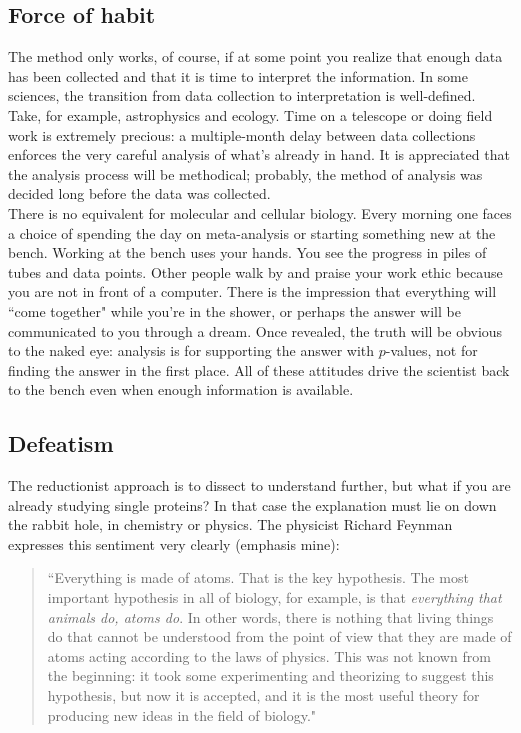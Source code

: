 \documentclass{article}
\begin{document}
\subsection*{Force of habit}

The method only works, of course, if at some point you realize that enough data has been collected and that it is time to interpret the information. In some sciences, the transition from data collection to interpretation is well-defined. Take, for example, astrophysics and ecology. Time on a telescope or doing field work is extremely precious: a multiple-month delay between data collections enforces the very careful analysis of what's already in hand. It is appreciated that the analysis process will be methodical; probably, the method of analysis was decided long before the data was collected.\\

There is no equivalent for molecular and cellular biology. Every morning one faces a choice of spending the day on meta-analysis or starting something new at the bench. Working at the bench uses your hands. You see the progress in piles of tubes and data points. Other people walk by and praise your work ethic because you are not in front of a computer. There is the impression that everything will ``come together" while you're in the shower, or perhaps the answer will be communicated to you through a dream. Once revealed, the truth will be obvious to the naked eye: analysis is for supporting the answer with $p$-values, not for finding the answer in the first place. All of these attitudes drive the scientist back to the bench even when enough information is available.

\subsection*{Defeatism}

The reductionist approach is to dissect to understand further, but what if you are already studying single proteins? In that case the explanation must lie on down the rabbit hole, in chemistry or physics. The physicist Richard Feynman expresses this sentiment very clearly (emphasis mine):

\begin{quote}
``Everything is made of atoms. That is the key hypothesis. The most important hypothesis in all of biology, for example, is that \textit{everything that animals do, atoms do}. In other words, there is nothing that living things do that cannot be understood from the point of view that they are made of atoms acting according to the laws of physics. This was not known from the beginning: it took some experimenting and theorizing to suggest this hypothesis, but now it is accepted, and it is the most useful theory for producing new ideas in the field of biology."
\end{quote}
\end{document}

